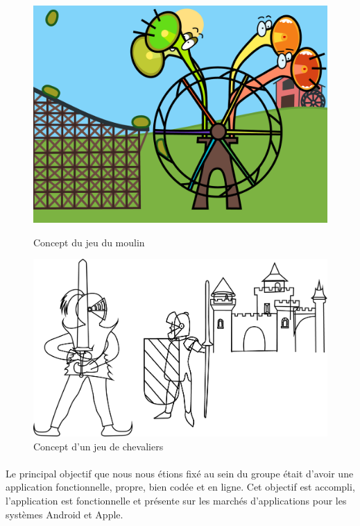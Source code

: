 \begin{figure}[H]\centering
   \begin{minipage}{0.49\textwidth}\centering
     \includegraphics[scale=0.1]{./img/concept_moulin.png}
     \caption{Concept du jeu du moulin}
     \label{jeu_concept1}
   \end{minipage}
   \begin {minipage}{0.49\textwidth}\centering
     \includegraphics[scale=0.1]{./img/concept_chevalier.png}
     \caption{Concept d'un jeu de chevaliers}
     \label{jeu_concept2}
   \end{minipage}
\end{figure}

\paragraph{}
Le principal objectif que nous nous étions fixé au sein du groupe était d'avoir une application fonctionnelle, propre, bien codée et en ligne. Cet objectif est accompli, l'application est fonctionnelle et présente sur les marchés d'applications pour les systèmes Android et Apple.

